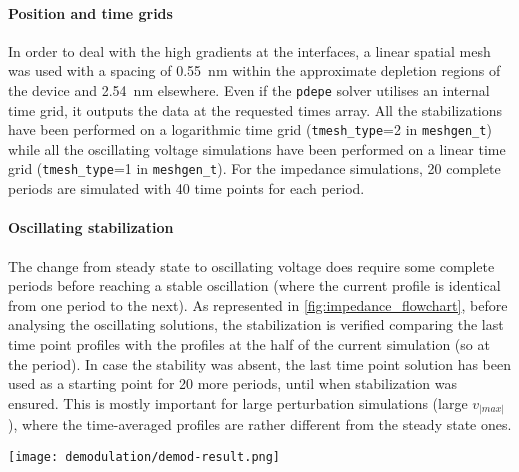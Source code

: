 	\paragraph{Position and time grids}
	In order to deal with the high gradients at the interfaces, a linear spatial mesh was used with a spacing of \SI{0.55}{\nm} within the approximate depletion regions of the device and \SI{2.54}{\nm} elsewhere.
	Even if the \texttt{pdepe} solver utilises an internal time grid, it outputs the data at the requested times array.
	All the stabilizations have been performed on a logarithmic time grid (\texttt{tmesh\_type}=2 in \texttt{meshgen_t}) while all the oscillating voltage simulations have been performed on a linear time grid (\texttt{tmesh\_type}=1 in \texttt{meshgen_t}).
	For the impedance simulations, 20 complete periods are simulated with 40 time points for each period.

	\paragraph{Oscillating stabilization}
	The change from steady state to oscillating voltage does require some complete periods before reaching a stable oscillation (where the current profile is identical from one period to the next).
	As represented in \cref{fig:impedance_flowchart}, before analysing the oscillating solutions, the stabilization is verified comparing the last time point profiles with the profiles at the half of the current simulation (so at the  period).
	In case the stability was absent, the last time point solution has been used as a starting point for 20 more periods, until when stabilization was ensured.
	This is mostly important for large perturbation simulations (large $v_|max|$), where the time\hyp{}averaged profiles are rather different from the steady state ones.

	\begin{SCfigure}%
		\centering
		\texttt{[image: demodulation/demod-result.png]}
		\label{fig:demodulation}
	\end{SCfigure}

